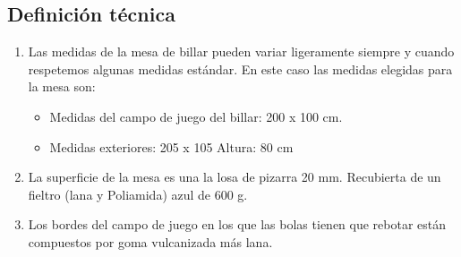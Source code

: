	\subsection {Definición técnica}
			\begin{enumerate}
			\item Las medidas de la mesa de billar pueden variar ligeramente siempre y cuando respetemos algunas medidas estándar. En este caso las medidas elegidas para la mesa son:
				\begin{itemize}      
				\item Medidas del campo de juego del billar: 200 x 100 cm.

				\item Medidas exteriores: 205 x 105 Altura: 80 cm
				\end{itemize}
				
			\item La superficie de la mesa es una la losa de pizarra 20 mm. Recubierta de un fieltro (lana y Poliamida) azul de 600 g.

			\item Los bordes del campo de juego en los que las bolas tienen que rebotar están compuestos por goma vulcanizada más lana.
			\end{enumerate}



